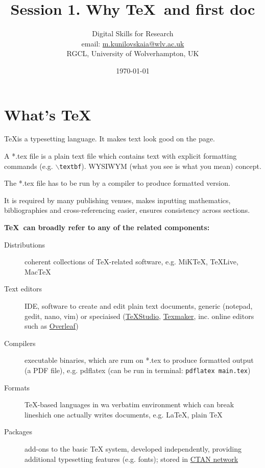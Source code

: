 \documentclass[a4paper,11pt]{article}  %
\title{Session 1. Why \TeX~and first doc}
\author{Digital Skills for Research \\ 
	email: \href{m.kunilovskaia@wlv.ac.uk}{m.kunilovskaia@wlv.ac.uk} \\ 
	RGCL, University of Wolverhampton, UK}
\date{\today}
\begin{document}
\maketitle

\tableofcontents


\section{What's \TeX}
\begin{tcolorbox}[width=\textwidth,colback={yellow!50!white}]
	\TeX is a typesetting language. It makes text look good on the page. 
	\medskip
	
	A *.tex file is a plain text file which contains text with explicit formatting commands (e.g. \texttt{$\backslash$textbf}). WYSIWYM (what you see is what you mean) concept.
	
	The *.tex file has to be run by a compiler to produce formatted version.
	\medskip
	
	It is required by many publishing venues, makes inputting mathematics, bibliographies and cross-referencing easier, ensures consistency across sections.
	
\end{tcolorbox}   

\vspace{1em}

\textbf{\Large{\TeX~can broadly refer to any of the related components:}}

\begin{description}
	\item[Distributions] coherent collections of TeX-related software, e.g. MiKTeX, TeXLive, MacTeX
	\item[Text editors] IDE, software to create and edit plain text documents, generic (notepad, gedit, nano, vim) or speciaised (\href{http://texstudio.sourceforge.net/}{TeXStudio}, \href{https://www.xm1math.net/texmaker/}{Texmaker}, inc. online editors such as \href{https://www.overleaf.com}{Overleaf})
	\item[Compilers] executable binaries, which are rum on *.tex to produce formatted output (a PDF file), e.g. pdflatex (can be run in terminal: \texttt{pdflatex main.tex})
	\item[Formats] TeX-based languages in wa verbatim environment which can break lineshich one actually writes documents, e.g. LaTeX, plain TeX
	\item[Packages] add-ons to the basic TeX system, developed independently, providing additional typesetting features (e.g. fonts); stored in \href{https://ctan.org/}{CTAN network}
\end{description}
\end{document}

